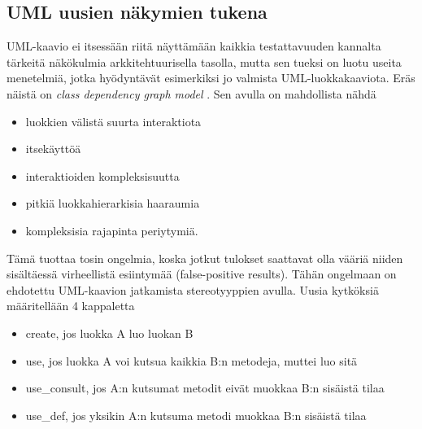 \documentclass[finnish]{tktltiki2}
\theoremstyle{definition}
\theoremstyle{remark}
\begin{document}
\subsection{UML uusien näkymien tukena}


UML-kaavio ei itsessään riitä näyttämään kaikkia testattavuuden kannalta tärkeitä näkökulmia arkkitehtuurisella tasolla, mutta sen tueksi on luotu useita menetelmiä, jotka hyödyntävät esimerkiksi jo valmista UML-luokkakaaviota. Eräs näistä on \textit{class dependency graph model} \citep[s. 4]{baudry_testability_2002}. Sen avulla on mahdollista nähdä 

\begin{itemize}
	\item luokkien välistä suurta interaktiota
	\item itsekäyttöä
	\item interaktioiden kompleksisuutta
	\item pitkiä luokkahierarkisia haaraumia
	\item kompleksisia rajapinta periytymiä.
\end{itemize}



Tämä tuottaa tosin ongelmia, koska jotkut tulokset saattavat olla vääriä niiden sisältäessä virheellistä esiintymää (false-positive results). Tähän ongelmaan on ehdotettu UML-kaavion jatkamista stereotyyppien avulla. Uusia kytköksiä määritellään 4 kappaletta \citep[s. 4]{baudry_measuring_2003}

\begin{itemize}
	\item create, jos luokka A luo luokan B
	\item use, jos luokka A voi kutsua kaikkia B:n metodeja, muttei luo sitä
	\item use\_consult, jos A:n kutsumat metodit eivät muokkaa B:n sisäistä tilaa
	\item use\_def, jos yksikin A:n kutsuma metodi muokkaa B:n sisäistä tilaa
\end{itemize}
\end{document}
